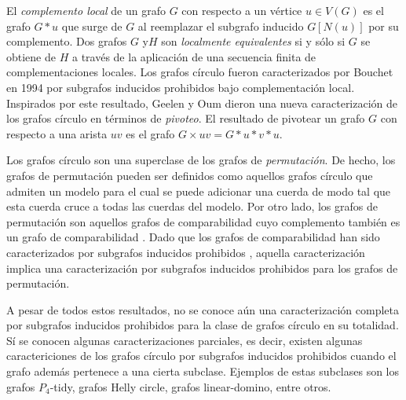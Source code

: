 \documentclass[12pt]{book}
\theoremstyle{plain}
\theoremstyle{remark}
\begin{document}
El \emph{complemento local }de un grafo $G$ con respecto a un vértice $u \in V(G)$ es el grafo $G*u$ que surge de $G$ al reemplazar el subgrafo inducido $G\left[N(u)\right]$ por su complemento. Dos grafos $G$ y$H$ son \emph{localmente equivalentes} si y sólo si $G$ se obtiene de $H$ a través de la aplicación de una secuencia finita de complementaciones locales. Los grafos círculo fueron caracterizados por Bouchet \cite{B94} en 1994 por subgrafos inducidos prohibidos bajo complementación local. Inspirados por este resultado, Geelen y Oum \cite{GO09} dieron una nueva caracterización de los grafos círculo en términos de \emph{pivoteo}. El resultado de pivotear un grafo $G$ con respecto a una arista $uv$ es el grafo $G \times uv = G * u * v * u$. 

Los grafos círculo son una superclase de los grafos de \emph{permutación}. De hecho, los grafos de permutación pueden ser definidos como aquellos grafos círculo que admiten un modelo para el cual se puede adicionar una cuerda de modo tal que esta cuerda cruce a todas las cuerdas del modelo. Por otro lado, los grafos de permutación son aquellos grafos de comparabilidad cuyo complemento también es un grafo de comparabilidad \cite{EPL72}. Dado que los grafos de comparabilidad han sido caracterizados por subgrafos inducidos prohibidos \cite{G67}, aquella caracterización implica una caracterización por subgrafos inducidos prohibidos para los grafos de permutación.

A pesar de todos estos resultados, no se conoce aún una caracterización completa por subgrafos inducidos prohibidos para la clase de grafos círculo en su totalidad. Sí se conocen algunas caracterizaciones parciales, es decir, existen algunas caractericiones de los grafos círculo por subgrafos inducidos prohibidos cuando el grafo además pertenece a una cierta subclase. Ejemplos de estas subclases son los grafos $P_4$-tidy, grafos Helly circle, grafos linear-domino, entre otros. 
\end{document}
